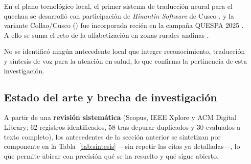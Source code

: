 \noindent En el plano tecnol{\'o}gico local, el primer sistema de traducci{\'o}n neural para el
quechua se desarroll{\'o} con participaci{\'o}n de \emph{Hinantin Software} de Cusco
\parencite{ortega2020quechua}, y la variante Collao/Cusco () fue incorporada reci{\'e}n en
la campa{\~n}a QUESPA 2025 \parencite{Ortega2025260}. A ello se suma el reto de la alfabetizaci{\'o}n
en zonas rurales andinas \parencite{inei2023,dispurse2023}.



No se identific{\'o} ning{\'u}n antecedente
local que integre reconocimiento, traducci{\'o}n y s{\'i}ntesis de voz para la atenci{\'o}n en salud,
lo que confirma la pertinencia de esta investigaci{\'o}n.

\subsection{Estado del arte y brecha de investigaci{\'o}n}
A partir de una \textbf{revisi{\'o}n sistem{\'a}tica} (Scopus, IEEE Xplore y ACM Digital Library;
62 registros identificados, 58 tras depurar duplicados y 30 evaluados a texto completo), los
antecedentes de la secci{\'o}n anterior se sintetizan por componente en la Tabla~\ref{tab:sintesis}
---sin repetir las citas ya detalladas---, lo que permite ubicar con precisi{\'o}n qu{\'e} se ha
resuelto y qu{\'e} sigue abierto.

